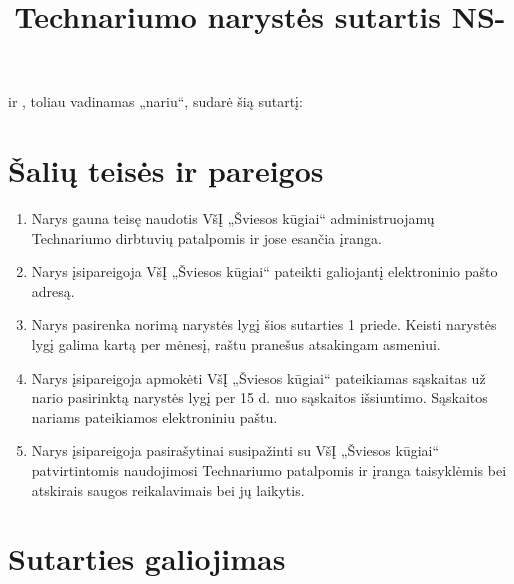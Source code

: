 \documentclass[
  paper=a4,
  fontsize=10pt,
  parskip=full,
  DIV=21,
  BCOR=8mm,
   footinclude=true,
  headheight=2pt,
  footheight=1pt,
  footsepline=true
]{scrartcl}
\title{Technariumo narystės sutartis NS-\getproperty{agreement}{number}}
\begin{document}
\pagestyle{scrheadings}





\maketitle


\textbf{} ir 
\textbf{}, toliau vadinamas „nariu“, sudarė šią sutartį:
\section{Šalių teisės ir pareigos}

\begin{enumerate}
\item Narys gauna teisę naudotis VšĮ „Šviesos kūgiai“ administruojamų Technariumo dirbtuvių patalpomis ir jose esančia įranga.
\item Narys įsipareigoja VšĮ „Šviesos kūgiai“ pateikti galiojantį elektroninio pašto adresą.
\item Narys pasirenka norimą narystės lygį šios sutarties 1 priede. Keisti narystės lygį galima kartą per mėnesį, raštu pranešus atsakingam asmeniui.   
\item Narys įsipareigoja apmokėti VšĮ „Šviesos kūgiai“ pateikiamas sąskaitas už nario pasirinktą narystės lygį per 15 d. nuo sąskaitos išsiuntimo. Sąskaitos nariams pateikiamos elektroniniu paštu.
\item Narys įsipareigoja pasirašytinai susipažinti su VšĮ „Šviesos kūgiai“ patvirtintomis naudojimosi Technariumo patalpomis ir įranga taisyklėmis bei atskirais saugos reikalavimais bei jų laikytis. 
\end{enumerate}

\section{Sutarties galiojimas}
\end{document}
